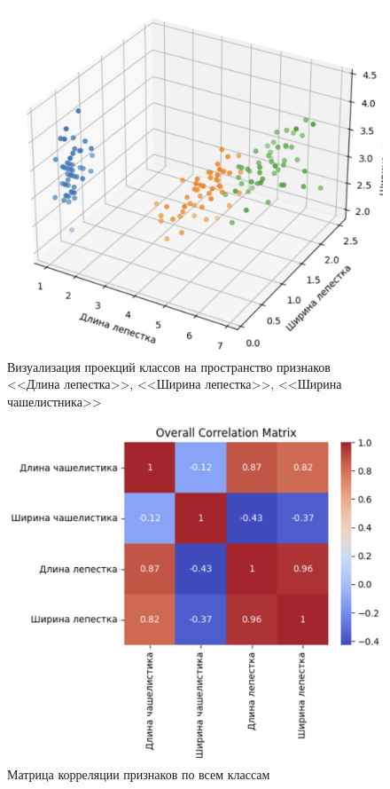 \begin{figure}
	\begin{center}
		\includegraphics[width=\textwidth]{images/3.png}
	\end{center}
	\caption{Визуализация проекций классов на пространство признаков {<<Длина лепестка>>, <<Ширина лепестка>>, <<Ширина чашелистника>>}}
	\label{img:3}
\end{figure}

\begin{figure}
	\begin{center}
		\includegraphics[width=\textwidth]{images/4.png}
	\end{center}
	\caption{Матрица корреляции признаков по всем классам}
	\label{img:4}
\end{figure}

